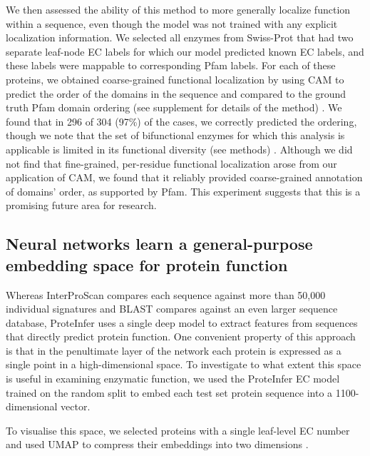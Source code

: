
We then assessed the ability of this method to more generally localize function within a sequence, even though the model was not trained with any explicit localization information. We selected all enzymes from Swiss-Prot that had two separate leaf-node EC labels for which our model predicted known EC labels, and these labels were mappable to corresponding Pfam labels. For each of these proteins, we obtained coarse-grained functional localization by using CAM to predict the order of the domains in the sequence and compared to the ground truth Pfam domain ordering \textnormal{(see supplement for details of the method)}%
. We found that in 296 of 304 (97\%) of the cases, we correctly predicted the ordering, though we note that the set of bifunctional enzymes for which this analysis is applicable is limited in its functional diversity \textnormal{(see methods)}%
. Although we did not find that fine-grained, per-residue functional localization arose from our application of CAM, we found that it reliably provided coarse-grained annotation of domains' order, as supported by Pfam. This experiment suggests that this is a promising future area for research.
\subsection*{Neural networks learn a general-purpose embedding space for protein function}
Whereas InterProScan compares each sequence against more than 50,000 %
individual signatures and BLAST compares against an even larger sequence database, ProteInfer uses a single deep model to extract features from sequences that directly predict protein function. One convenient property of this approach is that in the penultimate layer of the network each protein is expressed as a single point in a high-dimensional space. To investigate to what extent this space is useful in examining enzymatic function, we used the ProteInfer EC model trained on the random split to embed each test set protein sequence into a 1100-dimensional vector. 

To visualise this space, we selected proteins with a single leaf-level EC number and used UMAP to compress their embeddings into two dimensions \citep{umap}.

